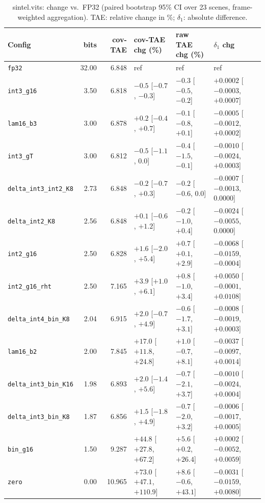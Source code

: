 \begin{table}[t]
\centering
\small
\caption{sintel.vits: change vs.\ FP32 (paired bootstrap 95\% CI over 23 scenes, frame-weighted aggregation). TAE: relative change in \%; $\delta_1$: absolute difference.}
\label{tab:boot_sintel_vits_fw}
\begin{tabular}{lrrlll}
\toprule
Config & bits & cov-TAE & cov-TAE chg (\%) & raw TAE chg (\%) & $\delta_1$ chg \\
\midrule
\texttt{fp32} & 32.00 & 6.848 & ref & ref & ref \\
\texttt{int3\_g16} & 3.50 & 6.818 & $-0.5$ [$-0.7$, $-0.3$] & $-0.3$ [$-0.5$, $-0.2$] & $+0.0002$ [$-0.0003$, $+0.0007$] \\
\texttt{lam16\_b3} & 3.00 & 6.878 & $+0.2$ [$-0.4$, $+0.7$] & $-0.1$ [$-0.8$, $+0.1$] & $-0.0005$ [$-0.0012$, $+0.0002$] \\
\texttt{int3\_gT} & 3.00 & 6.812 & $-0.5$ [$-1.1$, 0.0] & $-0.4$ [$-1.5$, $-0.1$] & $-0.0010$ [$-0.0024$, $+0.0003$] \\
\texttt{delta\_int3\_int2\_K8} & 2.73 & 6.848 & $-0.2$ [$-0.7$, $+0.3$] & $-0.2$ [$-0.6$, 0.0] & $-0.0007$ [$-0.0013$, 0.0000] \\
\texttt{delta\_int2\_K8} & 2.56 & 6.848 & $+0.1$ [$-0.6$, $+1.2$] & $-0.2$ [$-1.0$, $+0.4$] & $-0.0024$ [$-0.0055$, 0.0000] \\
\texttt{int2\_g16} & 2.50 & 6.828 & $+1.6$ [$-2.0$, $+5.4$] & $+0.7$ [$+0.1$, $+2.9$] & $-0.0068$ [$-0.0159$, $-0.0004$] \\
\texttt{int2\_g16\_rht} & 2.50 & 7.165 & $+3.9$ [$+1.0$, $+6.1$] & $+0.8$ [$-1.0$, $+3.4$] & $+0.0050$ [$-0.0001$, $+0.0108$] \\
\texttt{delta\_int4\_bin\_K8} & 2.04 & 6.915 & $+2.0$ [$-0.7$, $+4.9$] & $-0.6$ [$-1.7$, $+3.1$] & $-0.0008$ [$-0.0019$, $+0.0003$] \\
\texttt{lam16\_b2} & 2.00 & 7.845 & $+17.0$ [$+11.8$, $+24.8$] & $+1.0$ [$-0.7$, $+8.1$] & $-0.0037$ [$-0.0097$, $+0.0014$] \\
\texttt{delta\_int3\_bin\_K16} & 1.98 & 6.893 & $+2.0$ [$-1.4$, $+5.6$] & $-0.7$ [$-2.1$, $+3.7$] & $-0.0010$ [$-0.0024$, $+0.0004$] \\
\texttt{delta\_int3\_bin\_K8} & 1.87 & 6.856 & $+1.5$ [$-1.8$, $+4.9$] & $-0.7$ [$-2.0$, $+3.2$] & $-0.0006$ [$-0.0017$, $+0.0005$] \\
\texttt{bin\_g16} & 1.50 & 9.287 & $+44.8$ [$+27.8$, $+67.2$] & $+5.6$ [$+0.2$, $+26.4$] & $+0.0002$ [$-0.0052$, $+0.0059$] \\
\texttt{zero} & 0.00 & 10.965 & $+73.0$ [$+47.1$, $+110.9$] & $+8.6$ [$-0.6$, $+43.1$] & $-0.0031$ [$-0.0159$, $+0.0080$] \\
\bottomrule
\end{tabular}
\end{table}
